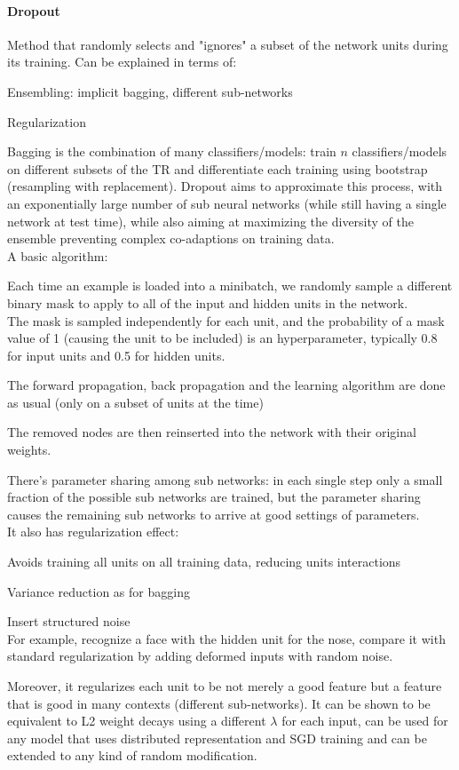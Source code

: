 \documentclass[10pt]{report}
\begin{document}
\paragraph{Dropout} Method that randomly selects and "ignores" a subset of the network units during its training. Can be explained in terms of:
\begin{list}{}{}
	\item Ensembling: implicit bagging, different sub-networks
	\item Regularization
\end{list}
Bagging is the combination of many classifiers/models: train $n$ classifiers/models on different subsets of the TR and differentiate each training using bootstrap (resampling with replacement). Dropout aims to approximate this process, with an exponentially large number of sub neural networks (while still having a single network at test time), while also aiming at maximizing the diversity of the ensemble preventing complex co-adaptions on training data.\\
A basic algorithm:
\begin{list}{}{}
	\item Each time an example is loaded into a minibatch, we randomly sample a different binary mask to apply to all of the input and hidden units in the network.\\
	The mask is sampled independently for each unit, and the probability of a mask value of 1 (causing the unit to be included) is an hyperparameter, typically 0.8 for input units and 0.5 for hidden units.
	\item The forward propagation, back propagation and the learning algorithm are done as usual (only on a subset of units at the time)
	\item The removed nodes are then reinserted into the network with their original weights.
\end{list}
There's parameter sharing among sub networks: in each single step only a small fraction of the possible sub networks are trained, but the parameter sharing causes the remaining sub networks to arrive at good settings of parameters.\\
It also has regularization effect:\begin{list}{}{}
	\item Avoids training all units on all training data, reducing units interactions
	\item Variance reduction as for bagging
	\item Insert structured noise\\
	For example, recognize a face with the hidden unit for the nose, compare it with standard regularization by adding deformed inputs with random noise.
\end{list}
Moreover, it regularizes each unit to be not merely a good feature but a feature that is good in many contexts (different sub-networks). It can be shown to be equivalent to L2 weight decays using a different $\lambda$ for each input, can be used for any model that uses distributed representation and SGD training and can be extended to any kind of random modification.
\end{document}
